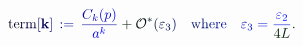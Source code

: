 \documentclass[12pt]{article}
\begin{document}
\makeatletter
\renewcommand*{\@textcolor}[3]{%
  \protect\leavevmode
  \begingroup
    \color#1{#2}#3%
  \endgroup
}
\makeatother
\begin{displaymath}
\mathrm { \mathcolor[RGB]{0,0,15}{t} \mathcolor[RGB]{0,0,30}{e} \mathcolor[RGB]{0,0,45}{r} \mathcolor[RGB]{0,0,60}{m} } \mathcolor[RGB]{0,0,75}{[} \mathbf { \mathcolor[RGB]{0,0,90}{k} } \mathcolor[RGB]{0,0,105}{]} \, \mathcolor[RGB]{0,0,120}{:} \mathcolor[RGB]{0,0,135}{=} \, \mathcolor[RGB]{0,0,150}{\frac { \mathcolor[RGB]{0,0,165}{C} _ { \mathcolor[RGB]{0,0,180}{k} } \mathcolor[RGB]{0,0,195}{(} \mathcolor[RGB]{0,0,210}{p} \mathcolor[RGB]{0,0,225}{)} } { \mathcolor[RGB]{0,0,240}{a} ^ { \mathcolor[RGB]{0,0,255}{k} } } } \mathcolor[RGB]{0,15,0}{+} \mathbf { \mathcal { \mathcolor[RGB]{0,15,15}{O} } } ^ { \mathcolor[RGB]{0,15,30}{*} } \mathcolor[RGB]{0,15,45}{(} \mathcolor[RGB]{0,15,60}{\varepsilon} _ { \mathcolor[RGB]{0,15,75}{3} } \mathcolor[RGB]{0,15,90}{)} \quad \mathrm { \mathcolor[RGB]{0,15,105}{w} \mathcolor[RGB]{0,15,120}{h} \mathcolor[RGB]{0,15,135}{e} \mathcolor[RGB]{0,15,150}{r} \mathcolor[RGB]{0,15,165}{e} } \quad \mathcolor[RGB]{0,15,180}{\varepsilon} _ { \mathcolor[RGB]{0,15,195}{3} } \mathcolor[RGB]{0,15,210}{=} \mathcolor[RGB]{0,15,225}{\frac { \mathcolor[RGB]{0,15,240}{\varepsilon} _ { \mathcolor[RGB]{0,15,255}{2} } } { \mathcolor[RGB]{0,30,0}{4} \mathcolor[RGB]{0,30,15}{L} } } \mathcolor[RGB]{0,30,30}{.}
\end{displaymath}
\end{document}
